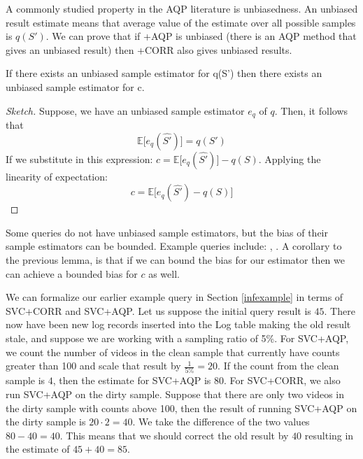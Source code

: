 A commonly studied property in the AQP literature is unbiasedness.
An unbiased result estimate means that average value of the estimate over all possible samples is $q(S')$.
We can prove that if \svcnospace+AQP is unbiased (there is an AQP method that gives an unbiased result) then \svcnospace+CORR also gives unbiased results.
\begin{lemma}\label{lemma:unbiased}
If there exists an unbiased sample estimator for q(S') then there exists an unbiased sample estimator for c.
\end{lemma}
\begin{proof}[Sketch] 
Suppose, we have an unbiased sample estimator $e_q$ of $q$. 
Then, it follows that \[\mathbb{E}\big[e_q(\widehat{S'})\big] = q(S')\]
If we substitute in this expression:
$c = \mathbb{E}\big[e_q(\widehat{S'})\big] - q(S) $.
Applying the linearity of expectation:
\[ c = \mathbb{E}\big[e_q(\widehat{S'}) - q(S)\big] \]
\end{proof}
Some queries do not have unbiased sample estimators, but the bias of their sample estimators can be bounded. Example queries include: \medfunc, \percfunc.
A corollary to the previous lemma, is that if we can bound the bias for our estimator then we can achieve a bounded bias for $c$ as well.


\begin{example}
We can formalize our earlier example query in Section \ref{infexample} in terms of SVC+CORR and SVC+AQP.
Let us suppose the initial query result is $45$.
There now have been new log records inserted into the Log table making the old result stale, and suppose we are working with a sampling ratio of 5\%.
For SVC+AQP, we count the number of videos in the clean sample that currently have counts greater than 100 and scale that result by $\frac{1}{5\%} = 20$. 
If the count from the clean sample is $4$, then the estimate for SVC+AQP is $80$.
For SVC+CORR, we also run SVC+AQP on the dirty sample.
Suppose that there are only two videos in the dirty sample with counts above 100, then the result of running SVC+AQP on the dirty sample is $20\cdot2 = 40$.
We take the difference of the two values $80 - 40 = 40$.
This means that we should correct the old result by $40$ resulting in the estimate of $45+40 = 85$.
\end{example}

